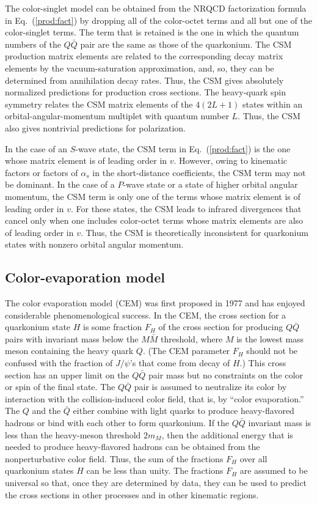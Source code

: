 The color-singlet model can be obtained from the NRQCD factorization
formula in Eq.~(\ref{prod:fact}) by dropping all of the color-octet
terms and all but one of the color-singlet terms. The term that is
retained is the one in which the quantum numbers of the $Q \bar Q$ pair
are the same as those of the quarkonium. The CSM production matrix
elements are related to the corresponding decay matrix elements by the
vacuum-saturation approximation, and, so, they can be determined from
annihilation decay rates. Thus, the CSM gives absolutely
normalized predictions for production cross sections. 
The heavy-quark spin symmetry relates the CSM
matrix elements of the $4(2L+1)$ states within an
orbital-angular-momentum multiplet with quantum number $L$. 
Thus, the CSM also gives nontrivial predictions for polarization.

In the case of an $S$-wave state, the CSM term in Eq.~(\ref{prod:fact})
is the one whose matrix element is of leading order in $v$. However,
owing to kinematic factors or factors of $\alpha_s$ in the short-distance
coefficients, the CSM term may not be dominant. In the case of a
$P$-wave state or a state of higher orbital angular momentum, the CSM
term is only one of the terms whose matrix element is of leading
order in $v$. For these states, the CSM leads to infrared divergences
that cancel only when one includes color-octet terms whose matrix
elements are also of leading order in $v$. Thus, the CSM is
theoretically inconsistent for quarkonium states with nonzero orbital
angular momentum.


\subsection{Color-evaporation model}
\label{prodsec:nrqcdCEM}

The color evaporation model (CEM) was first proposed in 1977 
\cite{Fritzsch:1977ay,Halzen:1977rs,Gluck:1977zm,Barger:1979js}
and has enjoyed considerable phenomenological success. 
In the CEM, the cross section for a quarkonium state $H$
is some fraction $F_H$ of the cross section for producing
$Q \bar Q$ pairs with invariant mass below the $M \bar M$ threshold, 
where $M$ is the lowest mass meson containing the heavy quark $Q$. 
(The CEM parameter $F_H$ should not be confused with the fraction
of $J/\psi$'s that come from decay of $H$.)
This cross section has an upper limit on the 
$Q \bar Q$ pair mass but no constraints on the 
color or spin of the final state.  The $Q \bar Q$ pair 
is assumed to neutralize its color by interaction with the
collision-induced color field, that is, by ``color evaporation.'' The
$Q$ and the $\bar Q$ either combine with light quarks to produce
heavy-flavored hadrons or bind with each other to form quarkonium.  If
the $Q \bar Q$ invariant mass is less than the heavy-meson threshold
$2m_M$, then the additional energy that is needed to produce
heavy-flavored hadrons can be obtained from the nonperturbative color
field. Thus, the sum of the fractions $F_H$ over all quarkonium states
$H$ can be less than unity. The fractions $F_H$ are assumed to be
universal so that, once they are determined by data, they can be used to
predict the cross sections in other processes and in other kinematic
regions.

